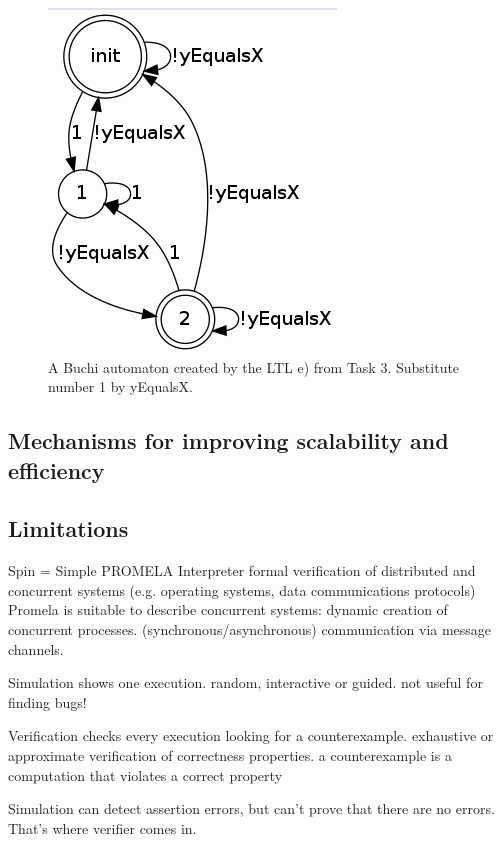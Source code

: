 \documentclass{report}
\begin{document}
\begin{figure} [\textwidth]
\hspace{1cm}
\includegraphics[scale=0.7]{Images/buchi.png}
\caption{A Buchi automaton created by the LTL e) from Task 3. Substitute number 1 by yEqualsX.}
\end{figure}

\subsection*{Mechanisms for improving scalability and efficiency}


\subsection*{Limitations}




Spin = Simple PROMELA Interpreter
formal verification of distributed and concurrent systems
(e.g. operating systems, data communications protocols)
Promela is suitable to describe concurrent systems:
dynamic creation of concurrent processes.
(synchronous/asynchronous) communication via message channels.

Simulation shows one execution.
random, interactive or guided.
not useful for finding bugs!

Verification checks every execution looking for a counterexample.
exhaustive or approximate verification of correctness properties.
a counterexample is a computation that violates a correct property

Simulation can detect assertion errors, but can't prove that there are no errors. That's where verifier comes in.
\end{document}
